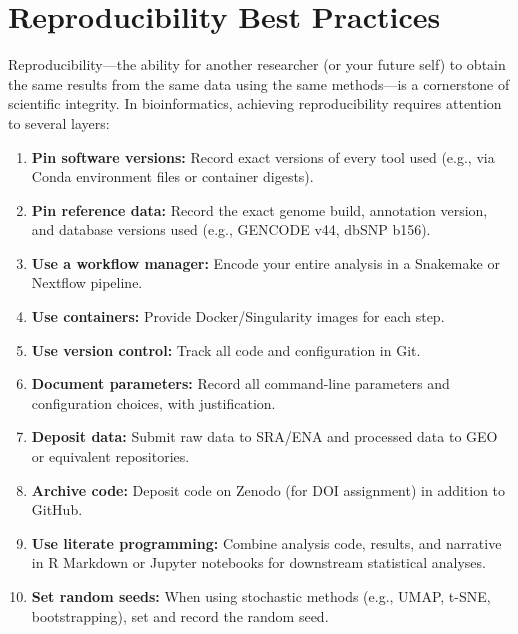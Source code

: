 \section{Reproducibility Best Practices}
\label{sec:bioinf:reproducibility}

Reproducibility---the ability for another researcher (or your future self) to obtain the same results from the same data using the same methods---is a cornerstone of scientific integrity. In bioinformatics, achieving reproducibility requires attention to several layers:

\begin{protocolbox}[title={Reproducibility Checklist}]
\begin{enumerate}[itemsep=3pt]
  \item \textbf{Pin software versions:} Record exact versions of every tool used (e.g., via Conda environment files or container digests).
  \item \textbf{Pin reference data:} Record the exact genome build, annotation version, and database versions used (e.g., GENCODE v44, dbSNP b156).
  \item \textbf{Use a workflow manager:} Encode your entire analysis in a Snakemake or Nextflow pipeline.
  \item \textbf{Use containers:} Provide Docker/Singularity images for each step.
  \item \textbf{Use version control:} Track all code and configuration in Git.
  \item \textbf{Document parameters:} Record all command-line parameters and configuration choices, with justification.
  \item \textbf{Deposit data:} Submit raw data to SRA/ENA and processed data to GEO or equivalent repositories.
  \item \textbf{Archive code:} Deposit code on Zenodo (for DOI assignment) in addition to GitHub.
  \item \textbf{Use literate programming:} Combine analysis code, results, and narrative in R Markdown or Jupyter notebooks for downstream statistical analyses.
  \item \textbf{Set random seeds:} When using stochastic methods (e.g., UMAP, t-SNE, bootstrapping), set and record the random seed.
\end{enumerate}
\end{protocolbox}

